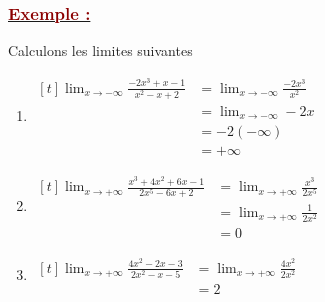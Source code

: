 \documentclass[12pt,a4paper]{article}
\begin{document}
\vspace{0.4cm}

\subsubsection*{\underline{\textcolor{darkred}{ Exemple : }}}
Calculons les limites suivantes

\vspace{0.3cm}

\begin{enumerate}
    \item 
    $\begin{aligned}[t]
        \lim_{x \to -\infty} \frac{-2x^3 + x - 1}{x^2 - x + 2} &= \lim_{x \to -\infty} \frac{-2x^3}{x^2} \\
        &= \lim_{x \to -\infty} -2x \\
        &= -2(-\infty) \\
        &= +\infty
    \end{aligned}$
    
    \vspace{0.2cm}

    \vspace{0.6cm}

    \item 
    $\begin{aligned}[t]
        \lim_{x \to +\infty} \frac{x^3 + 4x^2 + 6x - 1}{2x^5 - 6x + 2} &= \lim_{x \to +\infty} \frac{x^3}{2x^5} \\
        &= \lim_{x \to +\infty} \frac{1}{2x^2} \\
        &= 0
    \end{aligned}$
    
    \vspace{0.2cm}

    \vspace{0.6cm}

    \item 
    $\begin{aligned}[t]
        \lim_{x \to +\infty} \frac{4x^2 - 2x - 3}{2x^2 - x - 5} &= \lim_{x \to +\infty} \frac{4x^2}{2x^2} \\
        &= 2
    \end{aligned}$
    
    \vspace{0.2cm}
\end{enumerate}
\end{document}
